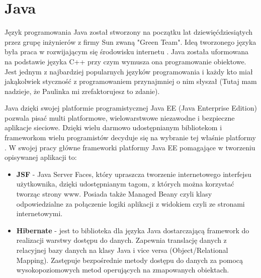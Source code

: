 \section{Java}
\label{sec:java}

Język programowania Java został stworzony na początku lat dziewięćdziesiątych przez grupę inżynierów z firmy Sun zwaną "Green Team". Ideą tworzonego języka była praca w rozwijającym się środowisku internetu \cite{Java01}. Java została uformowana na podstawie języka C++ przy czym wymusza ona programowanie obiektowe. Jest jednym z najbardziej popularnych języków programowania i każdy kto miał jakąkolwiek styczność z programowaniem przynajmniej o nim słyszał (Tutaj mam nadzieje, że Paulinka mi zrefaktorujesz to zdanie). 

Java dzięki swojej platformie programistycznej Java EE (Java Enterprise Edition) pozwala pisać multi platformowe, wielowarstwowe niezawodne i bezpieczne aplikacje sieciowe. Dzięki wielu darmowo udostępnianym bibliotekom i frameworkom wielu programistów decyduje się na wybranie tej właśnie platformy \cite{JEE01}. W swojej pracy główne frameworki platformy Java EE pomagające w tworzeniu opisywanej aplikacji to:
\begin{itemize}
	\item \textbf{JSF} - Java Server Faces, który upraszcza tworzenie internetowego interfejsu użytkownika, dzięki udostępnianym tagom, z których można korzystać tworząc strony www. Posiada także Managed Beany czyli klasy odpowiedzialne za połączenie logiki aplikacji z widokiem czyli ze stronami internetowymi.
	\item \textbf{Hibernate} - jest to biblioteka dla języka Java dostarczającą framework do realizacji warstwy dostępu do danych. Zapewnia translację danych z relacyjnej bazy danych na klasy Java i vice versa (Object/Relational Mapping). Zastępuje bezpośrednie metody dostępu do danych za pomocą wysokopoziomowych metod operujących na zmapowanych obiektach.
\end{itemize}



